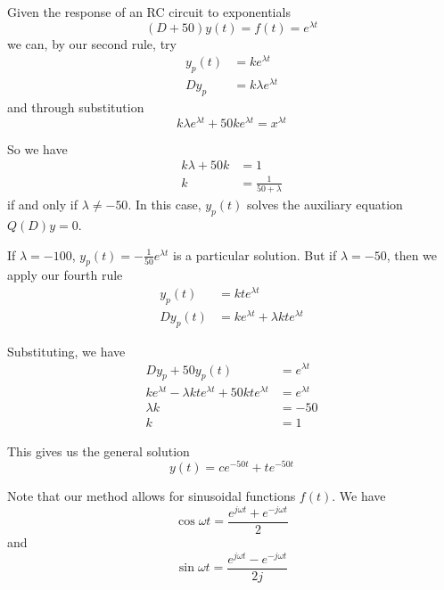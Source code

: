 \documentclass[12pt]{article}
\begin{document}
\begin{example}
Given the response of an RC circuit to exponentials \[ (D + 50)y(t) = f(t) = e^{\lambda t} \] we can, by our second rule, try
\begin{align*}
y_p(t) &= ke^{\lambda t}\\
Dy_p &= k\lambda e^{\lambda t}
\end{align*}
and through substitution \[ k\lambda e^{\lambda t} + 50ke^{\lambda t} = x^{\lambda t} \]

So we have
\begin{align*}
k\lambda + 50k &= 1\\
k &= \frac{1}{50+\lambda}
\end{align*}
if and only if $\lambda \neq -50$.  In this case, $y_p(t)$ solves the auxiliary equation $Q(D)y = 0$.

If $\lambda = -100$, $y_p(t) = -\frac{1}{50}e^{\lambda t}$ is a particular solution. But if $\lambda = -50$, then we apply our fourth rule
\begin{align*}
y_p(t) &= kte^{\lambda t}\\
Dy_p(t) &= ke^{\lambda t} + \lambda kte^{\lambda t}
\end{align*}

Substituting, we have
\begin{align*}
Dy_p + 50 y_p(t) &= e^{\lambda t}\\
ke^{\lambda t} - \lambda kte^{\lambda t} + 50kte^{\lambda t} &= e^{\lambda t}\\
\lambda k &= -50\\
k &= 1
\end{align*}

This gives us the general solution \[ y(t) = ce^{-50t} + te^{-50t} \]
\end{example}

Note that our method allows for sinusoidal functions $f(t)$. We have \[ \cos\omega t = \frac{e^{j\omega t} + e^{-j\omega t}}{2} \] and \[ \sin\omega t = \frac{e^{j\omega t} - e^{-j\omega t}}{2j} \]
\end{document}
